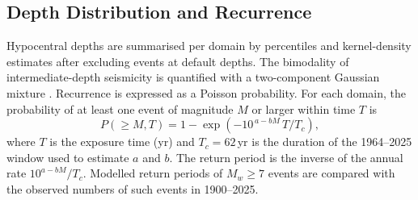 \documentclass[11pt]{article}
\begin{document}
\subsection{Depth Distribution and Recurrence}
Hypocentral depths are summarised per domain by percentiles and kernel-density
estimates after excluding events at default depths. The bimodality of
intermediate-depth seismicity is quantified with a two-component Gaussian mixture
\cite{Pedregosa2011}. Recurrence is expressed as a Poisson probability. For each
domain, the probability of at least one event of magnitude $M$ or larger within
time $T$ is
\begin{equation}
  P(\geq M, T) = 1 - \exp\!\left(-10^{\,a - bM}\, T / T_{c}\right), \label{eq:poisson}
\end{equation}
where $T$ is the exposure time (yr) and $T_c = 62$\,yr is the duration of the
1964--2025 window used to estimate $a$ and $b$. The return period is the inverse of
the annual rate $10^{a-bM}/T_c$. Modelled return periods of $M_w \geq 7$ events are
compared with the observed numbers of such events in 1900--2025.
\end{document}
